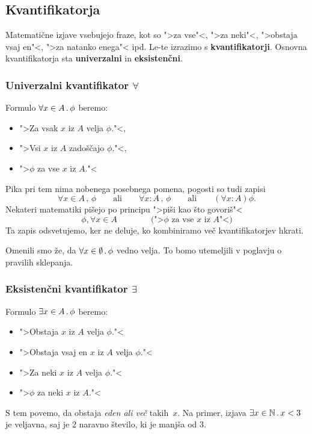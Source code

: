 \subsection{Kvantifikatorja}

Matematične izjave vsebujejo fraze, kot so ">za vse"<, ">za neki"<, ">obstaja vsaj en"<, ">za natanko enega"< ipd. Le-te izrazimo s \textbf{kvantifikatorji}. Osnovna kvantifikatorja sta \textbf{univerzalni} in \textbf{eksistenčni}.


\subsubsection{Univerzalni kvantifikator $\forall$}

Formulo $\forall x \in A \,.\, \phi$ beremo:
%
\begin{itemize}
\item ">Za vsak $x$ iz $A$ velja $\phi$."<,
\item ">Vsi $x$ iz $A$ zadoščajo $\phi$."<,
\item ">$\phi$ za vse $x$ iz $A$."<
\end{itemize}
%
Pika pri tem nima nobenega posebnega pomena, pogosti so tudi zapisi
%
\begin{equation*}
  \forall x \in A \,,\, \phi
  \qquad\text{ali}\qquad
  \forall x : A \,,\, \phi
  \qquad\text{ali}\qquad
  (\forall x : A) \phi.
\end{equation*}
%
Nekateri matematiki pišejo po principu ">piši kao što govoriš"<
%
\begin{equation*}
  \phi, \forall x \in A
  \qquad\qquad \text{(">$\phi$ za vse $x$ iz $A$"<)}
\end{equation*}
%
Ta zapis odsvetujemo, ker ne deluje, ko kombiniramo več kvantifikatorjev hkrati.

Omenili smo že, da $\forall x \in \emptyset \,.\, \phi$ vedno velja. To bomo utemeljili v poglavju o pravilih sklepanja.

\subsubsection{Eksistenčni kvantifikator $\exists$}

Formulo $\exists x \in A \,.\, \phi$ beremo:
%
\begin{itemize}
\item ">Obstaja $x$ iz $A$ velja $\phi$."<
\item ">Obstaja vsaj en $x$ iz $A$ velja $\phi$."<
\item ">Za neki $x$ iz $A$ velja $\phi$."<
\item ">$\phi$ za neki $x$ iz $A$."<
\end{itemize}
%
S tem povemo, da obstaja \emph{eden ali več} takih~$x$. Na primer, izjava $\exists x \in \mathbb{N} \,.\, x
< 3$ je veljavna, saj je $2$ naravno število, ki je manjša od $3$.


